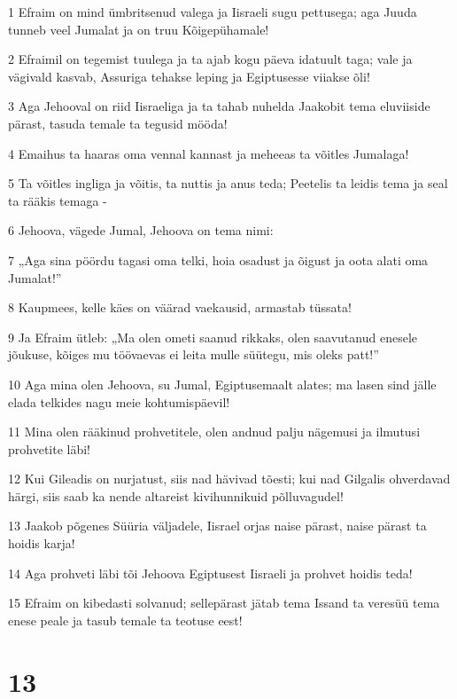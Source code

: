 \par 1 Efraim on mind ümbritsenud valega ja Iisraeli sugu pettusega; aga Juuda tunneb veel Jumalat ja on truu Kõigepühamale!
\par 2 Efraimil on tegemist tuulega ja ta ajab kogu päeva idatuult taga; vale ja vägivald kasvab, Assuriga tehakse leping ja Egiptusesse viiakse õli!
\par 3 Aga Jehooval on riid Iisraeliga ja ta tahab nuhelda Jaakobit tema eluviiside pärast, tasuda temale ta tegusid mööda!
\par 4 Emaihus ta haaras oma vennal kannast ja meheeas ta võitles Jumalaga!
\par 5 Ta võitles ingliga ja võitis, ta nuttis ja anus teda; Peetelis ta leidis tema ja seal ta rääkis temaga -
\par 6 Jehoova, vägede Jumal, Jehoova on tema nimi:
\par 7 „Aga sina pöördu tagasi oma telki, hoia osadust ja õigust ja oota alati oma Jumalat!”
\par 8 Kaupmees, kelle käes on väärad vaekausid, armastab tüssata!
\par 9 Ja Efraim ütleb: „Ma olen ometi saanud rikkaks, olen saavutanud enesele jõukuse, kõiges mu töövaevas ei leita mulle süütegu, mis oleks patt!”
\par 10 Aga mina olen Jehoova, su Jumal, Egiptusemaalt alates; ma lasen sind jälle elada telkides nagu meie kohtumispäevil!
\par 11 Mina olen rääkinud prohvetitele, olen andnud palju nägemusi ja ilmutusi prohvetite läbi!
\par 12 Kui Gileadis on nurjatust, siis nad hävivad tõesti; kui nad Gilgalis ohverdavad härgi, siis saab ka nende altareist kivihunnikuid põlluvagudel!
\par 13 Jaakob põgenes Süüria väljadele, Iisrael orjas naise pärast, naise pärast ta hoidis karja!
\par 14 Aga prohveti läbi tõi Jehoova Egiptusest Iisraeli ja prohvet hoidis teda!
\par 15 Efraim on kibedasti solvanud; sellepärast jätab tema Issand ta veresüü tema enese peale ja tasub temale ta teotuse eest!

\chapter{13}

